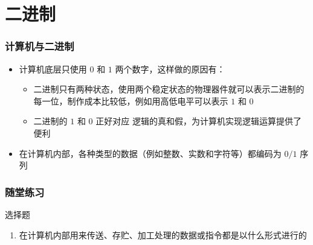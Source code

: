 \section{二进制}

\begin{frame}[fragile]
    \frametitle{计算机与二进制}

    \begin{itemize}[<+->]
        \item 计算机底层只使用 $0$ 和 $1$ 两个数字，这样做的原因有：
        \begin{itemize}
           \item 二进制只有两种状态，使用两个稳定状态的物理器件就可以表示二进制的每一位，制作成本比较低，例如用高低电平可以表示 $1$ 和 $0$
           \item 二进制的 $1$ 和 $0$ 正好对应 逻辑的真和假，为计算机实现逻辑运算提供了便利  
        \end{itemize}
        \item 在计算机内部，各种类型的数据（例如整数、实数和字符等）都编码为 $0/1$ 序列 
    \end{itemize}

\end{frame}

\begin{frame}[fragile]
    \frametitle{随堂练习}

    \begin{exampleblock}{选择题}

        \begin{enumerate}
            \item 在计算机内部用来传送、存贮、加工处理的数据或指令都是以什么形式进行的


        \end{enumerate}

    \end{exampleblock}
\end{frame}

